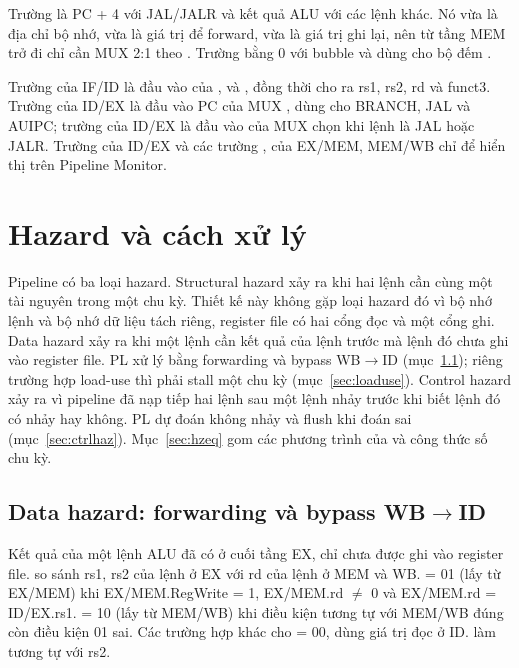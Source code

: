 \documentclass[../report.tex]{subfiles}
\begin{document}
Trường  là PC + 4 với JAL/JALR và kết quả ALU với các lệnh khác. Nó vừa là địa chỉ bộ nhớ, vừa là
giá trị để forward, vừa là giá trị ghi lại, nên từ tầng MEM trở đi chỉ cần MUX 2:1 theo . Trường
 bằng 0 với bubble và dùng cho bộ đếm .

Trường  của IF/ID là đầu vào của ,  và , đồng thời cho ra
rs1, rs2, rd và funct3. Trường  của ID/EX là đầu vào PC của MUX , dùng cho BRANCH, JAL và AUIPC;
trường  của ID/EX là đầu vào của MUX chọn  khi lệnh là JAL hoặc JALR. Trường  của
ID/EX và các trường ,  của EX/MEM, MEM/WB chỉ để hiển thị trên Pipeline Monitor.

\section{Hazard và cách xử lý}

Pipeline có ba loại hazard. Structural hazard xảy ra khi hai lệnh cần cùng một tài nguyên trong một chu kỳ. Thiết
kế này không gặp loại hazard đó vì bộ nhớ lệnh và bộ nhớ dữ liệu tách riêng, register file có hai cổng đọc và một
cổng ghi. Data hazard xảy ra khi một lệnh cần kết quả của lệnh trước mà lệnh đó chưa ghi vào register file. PL xử
lý bằng forwarding và bypass WB$\to$ID (mục~\ref{sec:fwd}); riêng trường hợp load-use thì phải stall một chu kỳ
(mục~\ref{sec:loaduse}). Control hazard xảy ra vì pipeline đã nạp tiếp hai lệnh sau một lệnh nhảy trước khi biết
lệnh đó có nhảy hay không. PL dự đoán không nhảy và flush khi đoán sai (mục~\ref{sec:ctrlhaz}).
Mục~\ref{sec:hzeq} gom các phương trình của  và công thức số chu kỳ.

\subsection{\texorpdfstring{Data hazard: forwarding và bypass WB$\to$ID}{Data hazard: forwarding và bypass WB-ID}}\label{sec:fwd}

Kết quả của một lệnh ALU đã có ở cuối tầng EX, chỉ chưa được ghi vào register file.  so sánh
rs1, rs2 của lệnh ở EX với rd của lệnh ở MEM và WB.  = 01 (lấy từ EX/MEM) khi EX/MEM.RegWrite = 1,
EX/MEM.rd $\neq$ 0 và EX/MEM.rd = ID/EX.rs1.  = 10 (lấy từ MEM/WB) khi điều kiện tương tự với MEM/WB đúng
còn điều kiện 01 sai. Các trường hợp khác cho  = 00, dùng giá trị đọc ở ID.  làm tương tự với rs2.
\end{document}

